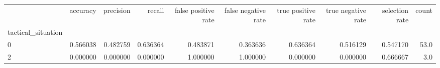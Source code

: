 \begin{tabular}{lrrrrrrrrr}
\toprule
{} &  accuracy &  precision &    recall &  false positive rate &  false negative rate &  true positive rate &  true negative rate &  selection rate &  count \\
tactical\_situation &           &            &           &                      &                      &                     &                     &                 &        \\
\midrule
0                  &  0.566038 &   0.482759 &  0.636364 &             0.483871 &             0.363636 &            0.636364 &            0.516129 &        0.547170 &   53.0 \\
2                  &  0.000000 &   0.000000 &  0.000000 &             1.000000 &             1.000000 &            0.000000 &            0.000000 &        0.666667 &    3.0 \\
\bottomrule
\end{tabular}

